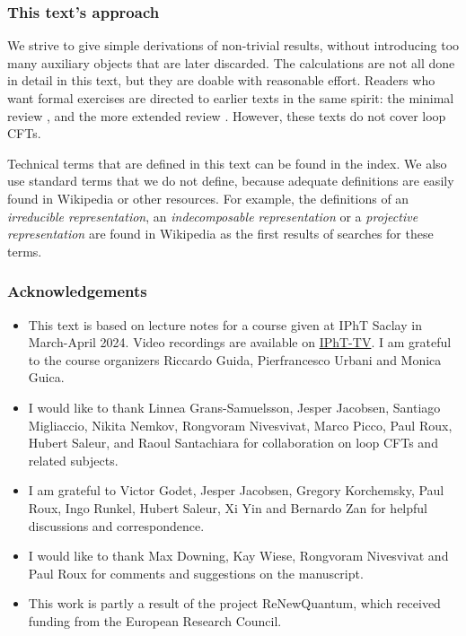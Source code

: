 \documentclass[12pt, a4paper]{article}
\begin{document}
\subsubsection*{This text's approach}

We strive to give simple derivations of non-trivial results, without introducing too many auxiliary objects that are later discarded. The calculations are not all done in detail in this text, but they are doable with reasonable effort. Readers who want formal exercises are directed to earlier texts in the same spirit: the minimal review \cite{rib16}, and the more extended review \cite{rib14}. However, these texts do not cover loop CFTs.

Technical terms that are defined in this text can be found in the index. We also use standard terms that we do not define, because adequate definitions are easily found in Wikipedia or other resources. For example, the definitions of an \textit{irreducible representation}, an \textit{indecomposable representation} or a \textit{projective representation} are found in Wikipedia as the first results of searches for these terms. 

\subsubsection*{Acknowledgements}

\begin{itemize}
 \item This text is based on lecture notes for a course given at IPhT Saclay in March-April 2024. Video recordings are available on \href{https://www.youtube.com/playlist?list=PLrLctLPAdPNtD7yFOcfdNx2J-A_CE1svr}{IPhT-TV}. I am grateful to the course organizers Riccardo Guida, Pierfrancesco Urbani and Monica Guica. 
 \item I would like to thank Linnea Grans-Samuelsson, Jesper Jacobsen, Santiago Migliaccio, Nikita Nemkov, Rongvoram Nivesvivat, Marco Picco, Paul Roux, Hubert Saleur, and Raoul Santachiara for collaboration on loop CFTs and related subjects. 
 \item I am grateful to Victor Godet, Jesper Jacobsen, Gregory Korchemsky, Paul Roux, Ingo Runkel, Hubert Saleur, Xi Yin and Bernardo Zan for helpful discussions and correspondence. 
 \item I would like to thank Max Downing, Kay Wiese, Rongvoram Nivesvivat and Paul Roux for comments and suggestions on the manuscript. 
 \item This work is partly a result of the project ReNewQuantum, which received funding from the European Research Council.
\end{itemize}
\end{document}

